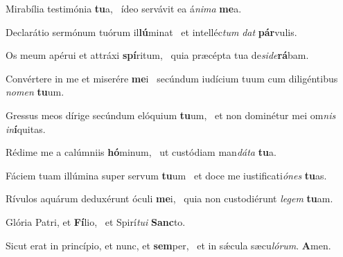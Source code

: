 \item Mirabília testimónia \textbf{tu}a,~\psstar{} ídeo servávit ea á\textit{nima} \textbf{me}a.

\item Declarátio sermónum tuórum il\textbf{lú}minat~\psstar{} et intelléc\textit{tum} \textit{dat} \textbf{pár}vulis.

\item Os meum apérui et attráxi \textbf{spí}ritum,~\psstar{} quia præcépta tua de\textit{side}\textbf{rá}bam.

\item Convértere in me et miserére \textbf{me}i~\psstar{} secúndum iudícium tuum cum diligéntibus \textit{nomen} \textbf{tu}um.

\item Gressus meos dírige secúndum elóquium \textbf{tu}um,~\psstar{} et non dominétur mei om\textit{nis} \textit{in}\textbf{í}quitas.

\item Rédime me a calúmniis \textbf{hó}minum,~\psstar{} ut custódiam man\textit{dáta} \textbf{tu}a.

\item Fáciem tuam illúmina super servum \textbf{tu}um~\psstar{} et doce me iustificati\textit{ónes} \textbf{tu}as.

\item Rívulos aquárum deduxérunt óculi \textbf{me}i,~\psstar{} quia non custodiérunt \textit{legem} \textbf{tu}am.

\item Glória Patri, et \textbf{Fí}lio,~\psstar{} et Spirí\textit{tui} \textbf{Sanc}to.

\item Sicut erat in princípio, et nunc, et \textbf{sem}per,~\psstar{} et in sǽcula sæcu\textit{lórum}. \textbf{A}men.